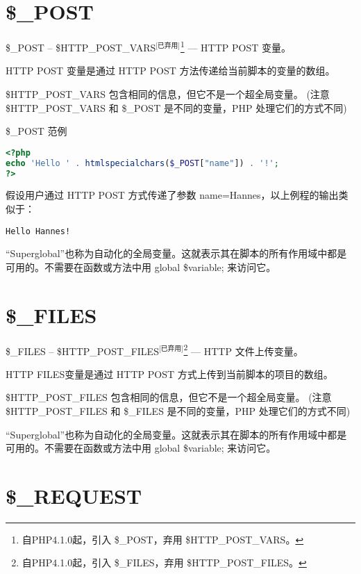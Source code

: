 \section{\$\_POST}

\$\_POST -- \$HTTP\_POST\_VARS$^{\text{[已弃用]}}$\footnote{自PHP4.1.0起，引入 \$\_POST，弃用 \$HTTP\_POST\_VARS。} — HTTP POST 变量。

HTTP POST 变量是通过 HTTP POST 方法传递给当前脚本的变量的数组。

\$HTTP\_POST\_VARS 包含相同的信息，但它不是一个超全局变量。 (注意 \$HTTP\_POST\_VARS 和 \$\_POST 是不同的变量，PHP 处理它们的方式不同)



\begin{example}
\$\_POST 范例
\begin{lstlisting}[language=PHP]
<?php
echo 'Hello ' . htmlspecialchars($_POST["name"]) . '!';
?>
\end{lstlisting}
\end{example}

假设用户通过 HTTP POST 方式传递了参数 name=Hannes，以上例程的输出类似于：

\begin{verbatim}
Hello Hannes!
\end{verbatim}


“Superglobal”也称为自动化的全局变量。这就表示其在脚本的所有作用域中都是可用的。不需要在函数或方法中用 global \$variable; 来访问它。


\section{\$\_FILES}

\$\_FILES -- \$HTTP\_POST\_FILES$^{\text{[已弃用]}}$\footnote{自PHP4.1.0起，引入 \$\_FILES，弃用 \$HTTP\_POST\_FILES。} — HTTP 文件上传变量。

HTTP FILES变量是通过 HTTP POST 方式上传到当前脚本的项目的数组。

\$HTTP\_POST\_FILES 包含相同的信息，但它不是一个超全局变量。 (注意 \$HTTP\_POST\_FILES 和 \$\_FILES 是不同的变量，PHP 处理它们的方式不同)

“Superglobal”也称为自动化的全局变量。这就表示其在脚本的所有作用域中都是可用的。不需要在函数或方法中用 global \$variable; 来访问它。




\section{\$\_REQUEST}


